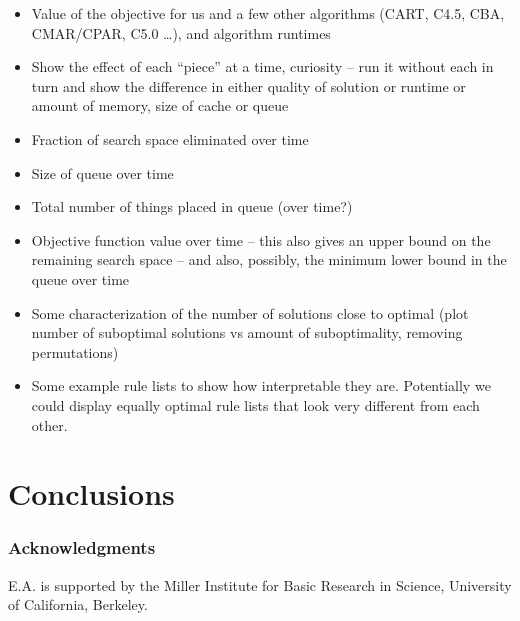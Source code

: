 \begin{itemize}

\item Value of the objective for us and a few other algorithms (CART, C4.5, CBA, CMAR/CPAR, C5.0 \dots), and algorithm runtimes 

\item Show the effect of each ``piece'' at a time, \eg curiosity -- run it without each in turn and show the difference in either quality of solution or runtime or amount of memory, size of cache or queue

\item Fraction of search space eliminated over time

\item Size of queue over time

\item Total number of things placed in queue (over time?)

\item Objective function value over time -- this also gives an upper bound on the remaining search space -- and also, possibly, the minimum lower bound in the queue over time

\item Some characterization of the number of solutions close to optimal (plot number of suboptimal solutions vs amount of suboptimality, removing permutations)

\item Some example rule lists to show how interpretable they are. Potentially we could display equally optimal rule lists that look very different from each other. 

\end{itemize}

\section{Conclusions}

\subsubsection*{Acknowledgments}

E.A. is supported by the Miller Institute for Basic Research in Science, University of California, Berkeley.



